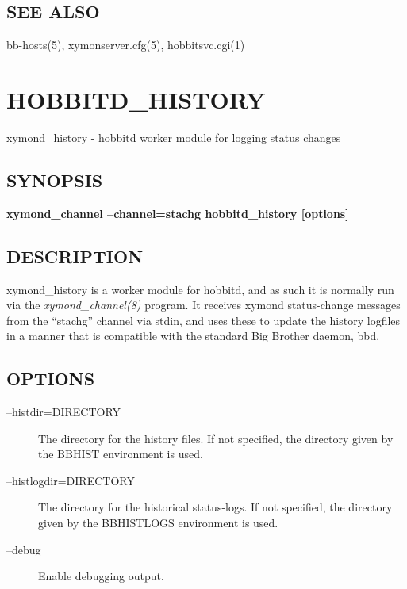 \subsection{SEE ALSO}
bb-hosts(5), xymonserver.cfg(5), hobbitsvc.cgi(1) 

 
  
%
\newpage
\section{HOBBITD\_HISTORY}

 xymond\_history - hobbitd worker module for logging status changes

 \subsection{SYNOPSIS}
\textbf{xymond\_channel --channel=stachg hobbitd\_history [options]}


 
\subsection{DESCRIPTION}
 xymond\_history is a worker module for hobbitd, and as such it is
 normally run via the \emph{xymond\_channel(8)} program. It receives
 xymond status-change messages from the ``stachg'' channel via stdin,
 and uses these to update the history logfiles in a manner that is
 compatible with the standard Big Brother daemon, bbd. 


 
\subsection{OPTIONS}
\begin{description}
\item[--histdir=DIRECTORY] The directory for the history files. If not
  specified, the directory given by the BBHIST environment is used. 


 

\item[--histlogdir=DIRECTORY] The directory for the historical status-logs. If not specified, the directory given by the BBHISTLOGS environment is used. 

 

\item[--debug] Enable debugging output. 

 


\end{description}
